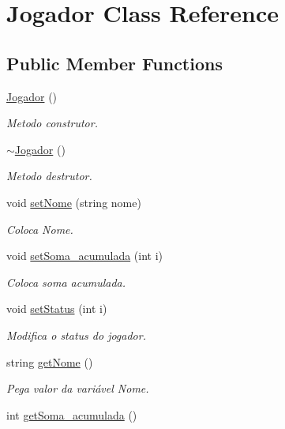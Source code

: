 \hypertarget{classJogador}{}\section{Jogador Class Reference}
\label{classJogador}
\subsection*{Public Member Functions}
\begin{DoxyCompactItemize}
\item 
\hyperlink{classJogador_a94a4939138ce04d2f3ceb68257517ac1}{Jogador} ()
\begin{DoxyCompactList}\small\item\em Metodo construtor. \end{DoxyCompactList}\item 
\hyperlink{classJogador_a3e62c32199fc9cfbcf22cf83f9008be6}{$\sim$\+Jogador} ()
\begin{DoxyCompactList}\small\item\em Metodo destrutor. \end{DoxyCompactList}\item 
void \hyperlink{classJogador_a0d9f47c126ff7fd73863c1bcba346afe}{set\+Nome} (string nome)
\begin{DoxyCompactList}\small\item\em Coloca Nome. \end{DoxyCompactList}\item 
void \hyperlink{classJogador_a16221b33e47d7e32a72d743a83a54ba9}{set\+Soma\+\_\+acumulada} (int i)
\begin{DoxyCompactList}\small\item\em Coloca soma acumulada. \end{DoxyCompactList}\item 
void \hyperlink{classJogador_ae3fbee4756dafc8a7b1775d54c1ddf5b}{set\+Status} (int i)
\begin{DoxyCompactList}\small\item\em Modifica o status do jogador. \end{DoxyCompactList}\item 
string \hyperlink{classJogador_ad99c974eb0be82064fbca936adc246d9}{get\+Nome} ()
\begin{DoxyCompactList}\small\item\em Pega valor da variável Nome. \end{DoxyCompactList}\item 
int \hyperlink{classJogador_afbb18454d2e8bd060a16cbabaec87c9a}{get\+Soma\+\_\+acumulada} ()

\end{DoxyCompactItemize}
